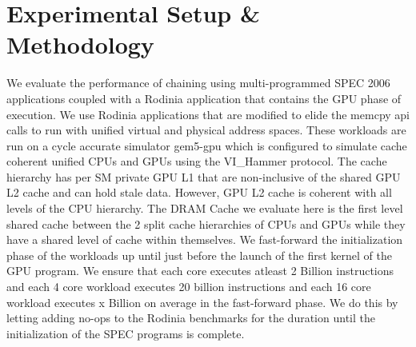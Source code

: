 \section{Experimental Setup \& Methodology}
We evaluate the performance of chaining using multi-programmed SPEC 2006 applications coupled with a Rodinia application that contains the GPU phase of execution. We use Rodinia \cite{rodinia} applications that are modified to elide the memcpy api calls to run with unified virtual and physical address spaces. These workloads are run on a cycle accurate simulator gem5-gpu \cite{gem5-gpu} which is configured to simulate cache coherent unified CPUs and GPUs using the VI\_Hammer protocol. The cache hierarchy has per SM private GPU L1  that are non-inclusive of the shared GPU L2 cache and can hold stale data. However, GPU L2 cache is coherent with all levels of the CPU hierarchy.
The DRAM Cache we evaluate here is the first level shared cache between the 2 split cache hierarchies of CPUs and GPUs while they have a shared level of cache within themselves.
We fast-forward the initialization phase of the workloads up until just before the launch of the first kernel of the GPU program. We ensure that each core executes atleast 2 Billion instructions and each 4 core workload executes 20 billion instructions and each 16 core workload executes x Billion on average in the fast-forward phase. We do this by letting adding no-ops to the Rodinia benchmarks for the duration until the initialization of the SPEC programs is complete.